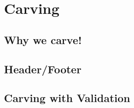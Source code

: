 \chapter{Carving}
\section{Why we carve!}
\section{Header/Footer}
\section{Carving with Validation}
